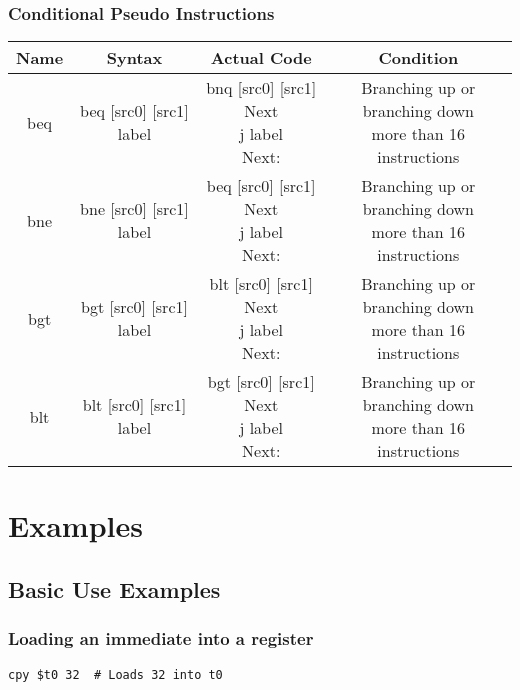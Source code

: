 \documentclass{article}
\begin{document}
		\subsubsection{Conditional Pseudo Instructions}
			\begin{center} \begin{tabular}{| c | c | c | c |} \hline
				Name & Syntax                    & Actual Code & Condition \\ \hline
				beq  & beq [src0] [src1] label & \thead{bnq [src0] [src1] Next \\ j label \\ Next:} & \thead{Branching up or branching down \\ more than 16 instructions}\\ \hline
				bne  & bne [src0] [src1] label & \thead{beq [src0] [src1] Next \\ j label \\ Next:} & \thead{Branching up or branching down \\ more than 16 instructions}\\ \hline
				bgt  & bgt [src0] [src1] label & \thead{blt [src0] [src1] Next \\ j label \\ Next:} & \thead{Branching up or branching down \\ more than 16 instructions}\\ \hline
				blt  & blt [src0] [src1] label & \thead{bgt [src0] [src1] Next \\ j label \\ Next:} & \thead{Branching up or branching down \\ more than 16 instructions}\\ \hline
			\end{tabular} \end{center}
\section{Examples}
	\lstset{language=sh}
	\subsection{Basic Use Examples}
		\subsubsection{Loading an immediate into a register}
			\begin{lstlisting}[frame=single]
cpy $t0 32	# Loads 32 into t0
			\end{lstlisting}
\end{document}
